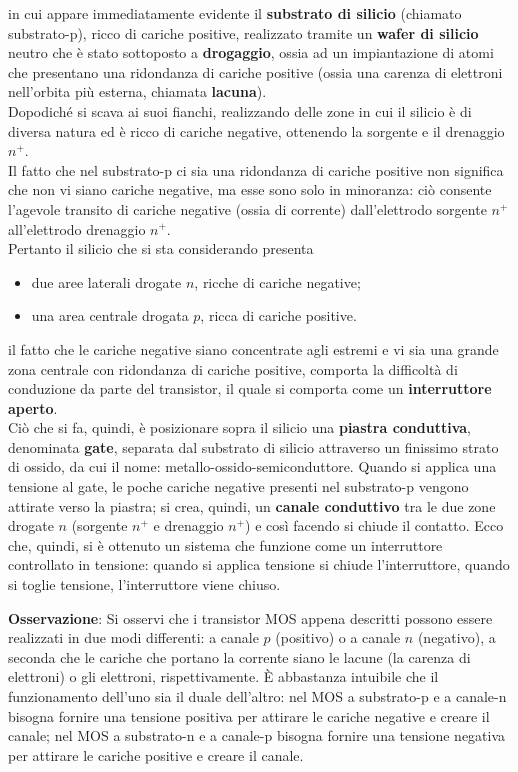 \documentclass[a4paper]{extarticle}
\begin{document}
\vspace{1em}
\noindent
in cui appare immediatamente evidente il \textbf{substrato di silicio} (chiamato substrato-p), ricco di cariche positive, realizzato tramite un \textbf{wafer di silicio} neutro che è stato sottoposto a \textbf{drogaggio}, ossia ad un impiantazione di atomi che presentano una ridondanza di cariche positive (ossia una carenza di elettroni nell'orbita più esterna, chiamata \textbf{lacuna}).\\
Dopodiché si scava ai suoi fianchi, realizzando delle zone in cui il silicio è di diversa natura ed è ricco di cariche negative, ottenendo la sorgente e il drenaggio $n^+$.\\
Il fatto che nel substrato-p ci sia una ridondanza di cariche positive non significa che non vi siano cariche negative, ma esse sono solo in minoranza: ciò consente l'agevole transito di cariche negative (ossia di corrente) dall'elettrodo sorgente $n^+$ all'elettrodo drenaggio $n^+$.\\
Pertanto il silicio che si sta considerando presenta
\begin{itemize}
    \item due aree laterali drogate $n$, ricche di cariche negative;
    \item una area centrale drogata $p$, ricca di cariche positive.
\end{itemize}
il fatto che le cariche negative siano concentrate agli estremi e vi sia una grande zona centrale con ridondanza di cariche positive, comporta la difficoltà di conduzione da parte del transistor, il quale si comporta come un \textbf{interruttore aperto}.\\
Ciò che si fa, quindi, è posizionare sopra il silicio una \textbf{piastra conduttiva}, denominata \textbf{gate}, separata dal substrato di silicio attraverso un finissimo strato di ossido, da cui il nome: metallo-ossido-semiconduttore. Quando si applica una tensione al gate, le poche cariche negative presenti nel substrato-p vengono attirate verso la piastra; si crea, quindi, un \textbf{canale conduttivo} tra le due zone drogate $n$ (sorgente $n^+$ e drenaggio $n^+$) e così facendo si chiude il contatto. Ecco che, quindi, si è ottenuto un sistema che funzione come un interruttore controllato in tensione: quando si applica tensione si chiude l'interruttore, quando si toglie tensione, l'interruttore viene chiuso.

\vspace{1em}
\noindent
\textbf{Osservazione}: Si osservi che i transistor MOS appena descritti possono essere realizzati in due modi differenti: a canale $p$ (positivo) o a canale $n$ (negativo), a seconda che le cariche che portano la corrente siano le lacune (la carenza di elettroni) o gli elettroni, rispettivamente. È abbastanza intuibile che il funzionamento dell'uno sia il duale dell'altro: nel MOS a substrato-p e a canale-n bisogna fornire una tensione positiva per attirare le cariche negative e creare il canale; nel MOS a substrato-n e a canale-p bisogna fornire una tensione negativa per attirare le cariche positive e creare il canale.
\end{document}
